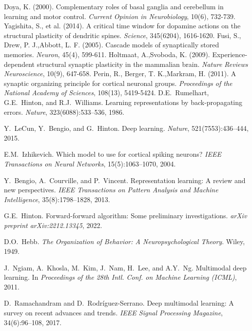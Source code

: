\documentclass[11pt]{article}
\begin{document}

\begin{thebibliography}{99}
 Doya, K. (2000). Complementary roles of basal ganglia and cerebellum in learning and motor control. \emph{Current Opinion in Neurobiology}, 10(6), 732-739.
 Yagishita, S., et al. (2014). A critical time window for dopamine actions on the structural plasticity of dendritic spines. \emph{Science}, 345(6204), 1616-1620.
 Fusi, S., Drew, P. J.,Abbott, L. F. (2005). Cascade models of synaptically stored memories. \emph{Neuron}, 45(4), 599-611.
 Holtmaat, A.,Svoboda, K. (2009). Experience-dependent structural synaptic plasticity in the mammalian brain. \emph{Nature Reviews Neuroscience}, 10(9), 647-658.
 Perin, R., Berger, T. K.,Markram, H. (2011). A synaptic organizing principle for cortical neuronal groups. \emph{Proceedings of the National Academy of Sciences}, 108(13), 5419-5424.
D.E.~Rumelhart, G.E.~Hinton, and R.J.~Williams.
\newblock Learning representations by back-propagating errors.
\newblock \emph{Nature}, 323(6088):533--536, 1986.

Y.~LeCun, Y.~Bengio, and G.~Hinton.
\newblock Deep learning.
\newblock \emph{Nature}, 521(7553):436--444, 2015.

E.M.~Izhikevich.
\newblock Which model to use for cortical spiking neurons?
\newblock \emph{IEEE Transactions on Neural Networks}, 15(5):1063--1070, 2004.

Y.~Bengio, A.~Courville, and P.~Vincent.
\newblock Representation learning: A review and new perspectives.
\newblock \emph{IEEE Transactions on Pattern Analysis and Machine Intelligence}, 35(8):1798--1828, 2013.

G.E.~Hinton.
\newblock Forward-forward algorithm: Some preliminary investigations.
\newblock \emph{arXiv preprint arXiv:2212.13345}, 2022.

D.O.~Hebb.
\newblock \emph{The Organization of Behavior: A Neuropsychological Theory}.
\newblock Wiley, 1949.

J.~Ngiam, A.~Khosla, M.~Kim, J.~Nam, H.~Lee, and A.Y.~Ng.
\newblock Multimodal deep learning.
\newblock In \emph{Proceedings of the 28th Intl. Conf. on Machine Learning (ICML)}, 2011.

D.~Ramachandram and D.~Rodr\'{i}guez-Serrano.
\newblock Deep multimodal learning: A survey on recent advances and trends.
\newblock \emph{IEEE Signal Processing Magazine}, 34(6):96--108, 2017.


\end{thebibliography}
\end{document}
